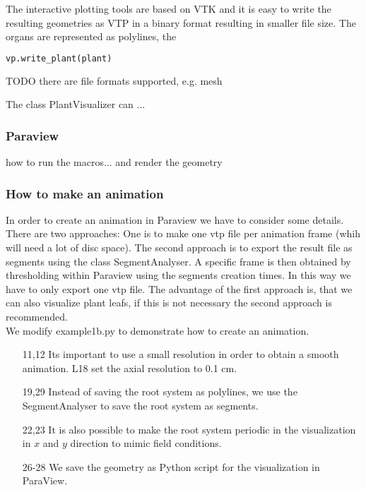 The interactive plotting tools are based on VTK and it is easy to write the resulting geometries as VTP in a binary format resulting in smaller file size. The organs are represented as polylines, the
\begin{lstlisting}[language=Python]
vp.write_plant(plant)
\end{lstlisting}
TODO there are file formats supported, e.g. mesh


The class PlantVisualizer can ...




\subsubsection*{Paraview}

how to run the macros... and render the geometry


\subsubsection*{How to make an animation} \label{ssec:animation}

In order to create an animation in Paraview we have to consider some details. There are two approaches: One is to make one vtp file per animation frame (whih will need a lot of disc space). The second approach is to export the result file as segments using the class SegmentAnalyser. A specific frame is then obtained by thresholding within Paraview using the segments creation times. In this way we have to only export one vtp file. The advantage of the first approach is, that we can also visualize plant leafs, if this is not necessary the second approach is recommended. \\






We modify example1b.py to demonstrate how to create an animation.

 

\begin{itemize}

\item[11,12] Its important to use a small resolution in order to obtain a smooth animation. L18 set the axial resolution to 0.1 cm. 

\item[19,29] Instead of saving the root system as polylines, we use the SegmentAnalyser to save the root system as segments.

\item[22,23] It is also possible to make the root system periodic in the visualization in $x$ and $y$ direction to mimic field conditions.

\item[26-28] We save the geometry as Python script for the visualization in ParaView.

\end{itemize}

